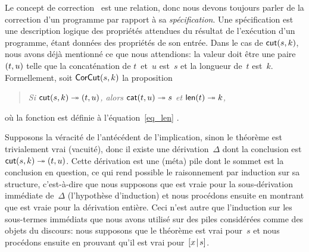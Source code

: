\label{par:cut_sound}

Le concept de correction~\citep{McCarthy_1962, Floyd_1967, Hoare_1971,
  Dijkstra_1976} est une relation, donc nous devons toujours parler de
la correction d'un programme par rapport à sa
\emph{spécification}. Une spécification est une
description logique des propriétés attendues du résultat de
l'exécution d'un programme, étant données des propriétés de son
entrée. Dans le cas de \(\textsf{cut}(s,k)\), nous avons déjà mentionné
ce que nous attendions: la valeur doit être une paire \(({t},{u})\)
telle que la concaténation de \(t\)~et~\(u\) est~\(s\) et la longueur
de~\(t\) est~\(k\). Formellement, soit
\(\textsf{CorCut}({s,k})\) la
proposition
\begin{quote}
  \textsl{Si \(\textsf{cut}(s,k) \twoheadrightarrow ({t},{u})\), alors
    \(\textsf{cat}(t,u) \twoheadrightarrow s\) et \(\textsf{len}(t)
    \twoheadrightarrow k\),}
\end{quote}
où la fonction  est définie à
l'équation~\eqref{eq_len} .

Supposons la véracité de l'antécédent de l'implication, sinon le
théorème est trivialement vrai (vacuité), donc il existe une
dérivation~\(\Delta\) dont la conclusion est \(\textsf{cut}(s,k)
\twoheadrightarrow ({t},{u})\). Cette dérivation est une (méta) pile
dont le sommet est la conclusion en question, ce qui rend possible le
raisonnement par induction sur sa structure, c'est-à-dire que nous
supposons que  est vraie pour la sous-dérivation
immédiate de~\(\Delta\) (l'hypothèse d'induction) et nous procédons
ensuite en montrant que  est vraie pour la dérivation
entière. Ceci n'est autre que l'induction sur les sous-termes
immédiats que nous avons utilisé sur des piles considérées comme des
objets du discours: nous supposons que le théorème est vrai pour~\(s\)
et nous procédons ensuite en prouvant qu'il est vrai
pour~\([{x}\!\mid\!{s}]\).

